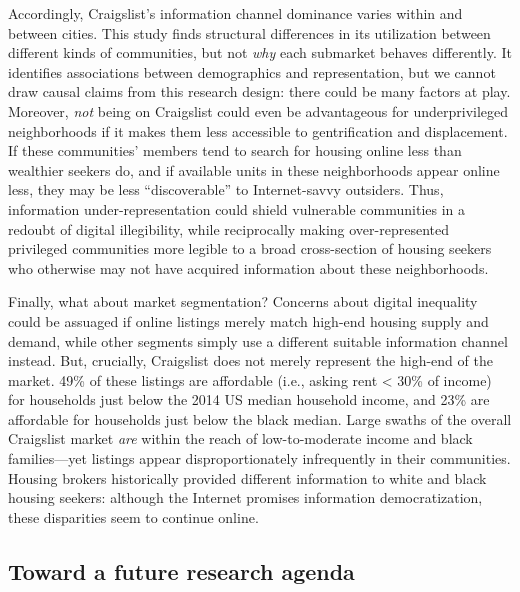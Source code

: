 \documentclass[11pt,letterpaper]{article}
\begin{document}
Accordingly, Craigslist's information channel dominance varies within and between cities. This study finds structural differences in its utilization between different kinds of communities, but not \emph{why} each submarket behaves differently. It identifies associations between demographics and representation, but we cannot draw causal claims from this research design: there could be many factors at play. Moreover, \emph{not} being on Craigslist could even be advantageous for underprivileged neighborhoods if it makes them less accessible to gentrification and displacement. If these communities' members tend to search for housing online less than wealthier seekers do, and if available units in these neighborhoods appear online less, they may be less \enquote{discoverable} to Internet-savvy outsiders. Thus, information under-representation could shield vulnerable communities in a redoubt of digital illegibility, while reciprocally making over-represented privileged communities more legible to a broad cross-section of housing seekers who otherwise may not have acquired information about these neighborhoods.

Finally, what about market segmentation? Concerns about digital inequality could be assuaged if online listings merely match high-end housing supply and demand, while other segments simply use a different suitable information channel instead. But, crucially, Craigslist does not merely represent the high-end of the market. 49\% of these listings are affordable (i.e., asking rent < 30\% of income) for households just below the 2014 US median household income, and 23\% are affordable for households just below the black median. Large swaths of the overall Craigslist market \emph{are} within the reach of low-to-moderate income and black families---yet listings appear disproportionately infrequently in their communities. Housing brokers historically provided different information to white and black housing seekers: although the Internet promises information democratization, these disparities seem to continue online.

\subsection{Toward a future research agenda}
\end{document}
